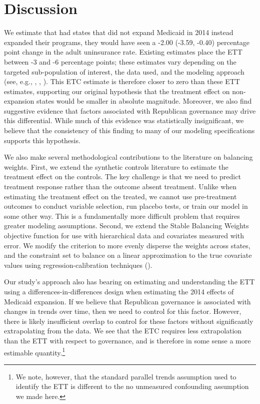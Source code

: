 \documentclass[aoas]{imsart}
\theoremstyle{plain}
\theoremstyle{remark}
\begin{document}
\section{Discussion}

We estimate that had states that did not expand Medicaid in 2014 instead expanded their programs, they would have seen a -2.00 (-3.59, -0.40) percentage point change in the adult uninsurance rate. Existing estimates place the ETT between -3 and -6 percentage points; these estimates vary depending on the targeted sub-population of interest, the data used, and the modeling approach (see, e.g., \cite{courtemanche2017early}, \cite{kaestner2017effects}, \cite{frean2017premium}). This ETC estimate is therefore closer to zero than these ETT estimates, supporting our original hypothesis that the treatment effect on non-expansion states would be smaller in absolute magnitude. Moreover, we also find suggestive evidence that factors associated with Republican governance may drive this differential. While much of this evidence was statistically insignificant, we believe that the consistency of this finding to many of our modeling specifications supports this hypothesis.

We also make several methodological contributions to the literature on balancing weights. First, we extend the synthetic controls literature to estimate the treatment effect on the controls. The key challenge is that we need to predict treatment response rather than the outcome absent treatment. Unlike when estimating the treatment effect on the treated, we cannot use pre-treatment outcomes to conduct variable selection, run placebo tests, or train our model in some other way. This is a fundamentally more difficult problem that requires greater modeling assumptions. Second, we extend the Stable Balancing Weights objective function for use with hierarchical data and covariates measured with error. We modify the criterion to more evenly disperse the weights across states, and the constraint set to balance on a linear approximation to the true covariate values using regression-calibration techniques (\cite{gleser1992importance}).

Our study's approach also has bearing on estimating and understanding the ETT using a differences-in-differences design when estimating the 2014 effects of Medicaid expansion. If we believe that Republican governance is associated with changes in trends over time, then we need to control for this factor. However, there is likely insufficient overlap to control for these factors without significantly extrapolating from the data. We see that the ETC requires less extrapolation than the ETT with respect to governance, and is therefore in some sense a more estimable quantity.\footnote{We note, however, that the standard parallel trends assumption used to identify the ETT is different to the no unmeasured confounding assumption we made here.} 
\end{document}
